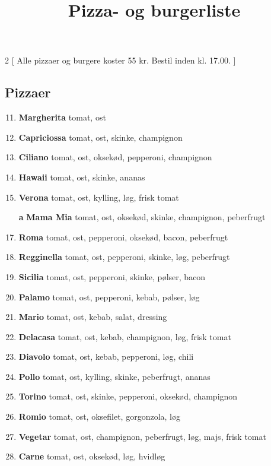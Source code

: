 \documentclass[danish,a4paper]{article}
\title{Pizza- og burgerliste}
\date{}
\author{}
\begin{document}

\maketitle

\begin{multicols}{2}
[
\noindent Alle pizzaer og burgere koster 55 kr. Bestil inden kl. 17.00.
]
\subsection*{Pizzaer}
\begin{enumerate}[label={\large\textbf{\arabic*}.}]
    \setcounter{enumi}{10}
    \item \textbf{Margherita} tomat, ost
    \item \textbf{Capriciossa} tomat, ost, skinke, champignon
    \item \textbf{Ciliano} tomat, ost, oksekød, pepperoni, champignon
    \item \textbf{Hawaii} tomat, ost, skinke, ananas
    \item \textbf{Verona} tomat, ost, kylling, løg, frisk tomat
    \setcounter{enumi}{14}
    \item[{\large\textbf{\refstepcounter{enumi}\number\value{enumi}a}}] \textbf{Mama Mia} tomat, ost, oksekød, skinke, champignon, peberfrugt
    \item \textbf{Roma} tomat, ost, pepperoni, oksekød, bacon, peberfrugt
    \item \textbf{Regginella} tomat, ost, pepperoni, skinke, løg, peberfrugt
    \item \textbf{Sicilia} tomat, ost, pepperoni, skinke, pølser, bacon
    \item \textbf{Palamo} tomat, ost, pepperoni, kebab, pølser, løg
    \item \textbf{Mario} tomat, ost, kebab, salat, dressing
    \item \textbf{Delacasa} tomat, ost, kebab, champignon, løg, frisk tomat
    \item \textbf{Diavolo} tomat, ost, kebab, pepperoni, løg, chili
    \item \textbf{Pollo} tomat, ost, kylling, skinke, peberfrugt, ananas
    \item \textbf{Torino} tomat, ost, skinke, pepperoni, oksekød, champignon
    \item \textbf{Romio} tomat, ost, oksefilet, gorgonzola, løg
    \item \textbf{Vegetar} tomat, ost, champignon, peberfrugt, løg, majs, frisk tomat
    \item \textbf{Carne} tomat, ost, oksekød, løg, hvidløg
\end{enumerate}

\end{multicols}
\end{document}
